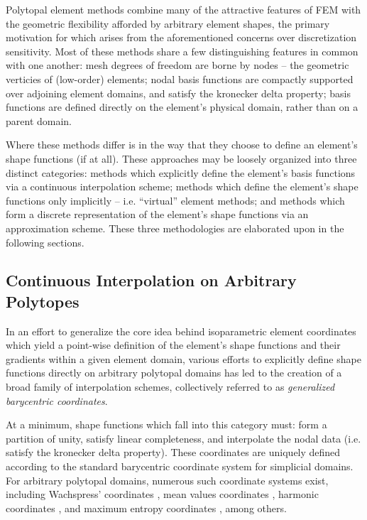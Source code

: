 	Polytopal element methods combine many of the attractive features of FEM with the geometric flexibility afforded by arbitrary element shapes, the primary motivation for which arises from the aforementioned concerns over discretization sensitivity. Most of these methods share a few distinguishing features in common with one another: mesh degrees of freedom are borne by nodes -- the geometric verticies of (low-order) elements; nodal basis functions are compactly supported over adjoining element domains, and satisfy the kronecker delta property; basis functions are defined directly on the element's physical domain, rather than on a parent domain.
	
	Where these methods differ is in the way that they choose to define an element's shape functions (if at all). These approaches may be loosely organized into three distinct categories: methods which explicitly define the element's basis functions via a continuous interpolation scheme; methods which define the element's shape functions only implicitly -- i.e. ``virtual'' element methods; and methods which form a discrete representation of the element's shape functions via an approximation scheme. These three methodologies are elaborated upon in the following sections.

	\subsection*{Continuous Interpolation on Arbitrary Polytopes}
		In an effort to generalize the core idea behind isoparametric element coordinates which yield a point-wise definition of the element's shape functions and their gradients within a given element domain, various efforts to explicitly define shape functions directly on arbitrary polytopal domains has led to the creation of a broad family of interpolation schemes, collectively referred to as \textit{generalized barycentric coordinates}.
		
		At a minimum, shape functions which fall into this category must: form a partition of unity, satisfy linear completeness, and interpolate the nodal data (i.e. satisfy the kronecker delta property). These coordinates are uniquely defined according to the standard barycentric coordinate system for simplicial domains. For arbitrary polytopal domains, numerous such coordinate systems exist, including Wachspress' coordinates \cite{Wachspress:75}, mean values coordinates \cite{Floater:03}, harmonic coordinates \cite{Joshi:07}, and maximum entropy coordinates \cite{Sukumar:04}, among others.
			
